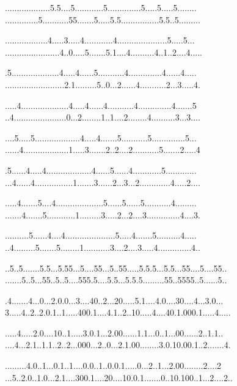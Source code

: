 \documentclass{article}
\begin{document}
\begin{figure}[h]
\centering
\begin{minipage}[t]{.5\textwidth}
\raggedright
...................5.5....5............5..............5.....5.....5........
..............5...........55.......5.....5.5................5.5..5.........
\

..................4.....3.....4............4.....................5.....5...
.......................4..0.....5.......5.1....4..........4..1..2....4.....
\

.5....................4.....4......5...........4..............4......4.....
.........................2.1.........5..0...2......4...........2...3.....4.

.....4....................4.....4......4...........4..............4.......5
..4......................0...2........1..1....2........4..........3...3....

....5.....5...................4.....4.......5...........5..............5...
......4...................1.....3.......2..2....2...........5.......2.....4

.5......4.....4...................4......5......4............5.............
...4......4................1.......3......2...3...2.............4.....2....

.....4.......5....4....................5......5......5...........4.........
.......4.......5............1.........3.....2...2....3..............4....3.

..........5......4....4.....................5.....4.......5..........4.....
..4.........5.......5........1...........3....2....3.....4..............4..



\end{minipage}%
\begin{minipage}[t]{.5\textwidth}
\raggedleft
..5..5.......5.5...5.55...5....55...5..55.....5.5.5...5.5...55....5....55..
.......5..5...55..5..5....555.5....5.5...5.5.5.........55..5555..5......5..

.4.......4...0...2.0.0...3....40..2...20.....5.1....4.0....30....4...3.0...
3.....4..2..2.0.1..1.....400.1....4.1..2..10.....4....40.1.000.1.....4.....

.....4.....2.0....10..1.....3.0.1...2.00......1.1...0..1...00......2..1.1..
....4...2.1..1.1..2..2...000...2..0...2.1.00........3.0.10.00.1..2.......4.

.........4.0..1...0.1..1....0.0..1..0.0.1.....0...2..1...2.00........2....2
...5..2.0..1.0...2.1....300.1....20....10.0.1.......0..10.100..1...2....2..


\end{minipage}
\end{figure}
\end{document}
